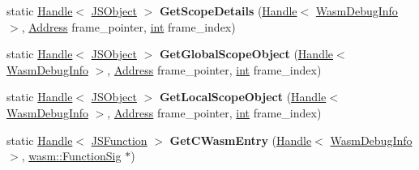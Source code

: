 \begin{DoxyCompactItemize}
\item 
\mbox{\label{classv8_1_1internal_1_1WasmDebugInfo_a9a5bfdbd39eab47c8032f12ab2c7083a}} 
static \mbox{\hyperlink{classv8_1_1internal_1_1Handle}{Handle}}$<$ \mbox{\hyperlink{classv8_1_1internal_1_1JSObject}{J\+S\+Object}} $>$ {\bfseries Get\+Scope\+Details} (\mbox{\hyperlink{classv8_1_1internal_1_1Handle}{Handle}}$<$ \mbox{\hyperlink{classv8_1_1internal_1_1WasmDebugInfo}{Wasm\+Debug\+Info}} $>$, \mbox{\hyperlink{classuintptr__t}{Address}} frame\+\_\+pointer, \mbox{\hyperlink{classint}{int}} frame\+\_\+index)
\item 
\mbox{\label{classv8_1_1internal_1_1WasmDebugInfo_a0d5da6920f80e6b54d6ff4bdb353df32}} 
static \mbox{\hyperlink{classv8_1_1internal_1_1Handle}{Handle}}$<$ \mbox{\hyperlink{classv8_1_1internal_1_1JSObject}{J\+S\+Object}} $>$ {\bfseries Get\+Global\+Scope\+Object} (\mbox{\hyperlink{classv8_1_1internal_1_1Handle}{Handle}}$<$ \mbox{\hyperlink{classv8_1_1internal_1_1WasmDebugInfo}{Wasm\+Debug\+Info}} $>$, \mbox{\hyperlink{classuintptr__t}{Address}} frame\+\_\+pointer, \mbox{\hyperlink{classint}{int}} frame\+\_\+index)
\item 
\mbox{\label{classv8_1_1internal_1_1WasmDebugInfo_a9f3bba8157341117f44743cac5da5196}} 
static \mbox{\hyperlink{classv8_1_1internal_1_1Handle}{Handle}}$<$ \mbox{\hyperlink{classv8_1_1internal_1_1JSObject}{J\+S\+Object}} $>$ {\bfseries Get\+Local\+Scope\+Object} (\mbox{\hyperlink{classv8_1_1internal_1_1Handle}{Handle}}$<$ \mbox{\hyperlink{classv8_1_1internal_1_1WasmDebugInfo}{Wasm\+Debug\+Info}} $>$, \mbox{\hyperlink{classuintptr__t}{Address}} frame\+\_\+pointer, \mbox{\hyperlink{classint}{int}} frame\+\_\+index)
\item 
\mbox{\label{classv8_1_1internal_1_1WasmDebugInfo_a5f0c8df99342eeebdfde00f066ce09c1}} 
static \mbox{\hyperlink{classv8_1_1internal_1_1Handle}{Handle}}$<$ \mbox{\hyperlink{classv8_1_1internal_1_1JSFunction}{J\+S\+Function}} $>$ {\bfseries Get\+C\+Wasm\+Entry} (\mbox{\hyperlink{classv8_1_1internal_1_1Handle}{Handle}}$<$ \mbox{\hyperlink{classv8_1_1internal_1_1WasmDebugInfo}{Wasm\+Debug\+Info}} $>$, \mbox{\hyperlink{classv8_1_1internal_1_1Signature}{wasm\+::\+Function\+Sig}} $\ast$)
\end{DoxyCompactItemize}
